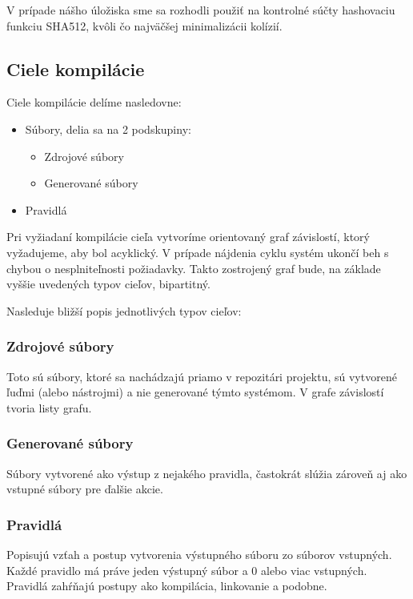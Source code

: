 V prípade nášho úložiska sme sa rozhodli použiť na kontrolné súčty hashovaciu funkciu
SHA512, kvôli čo najväčšej minimalizácii kolízií.

\subsection{Ciele kompil\'{a}cie}
\label{sub:solution:targets}
Ciele kompilácie delíme nasledovne:

\begin{itemize}
  \item Súbory, delia sa na 2 podskupiny:
    \begin{itemize}
      \item Zdrojové súbory
      \item Generované súbory
    \end{itemize}
  \item Pravidlá
\end{itemize}

Pri vyžiadaní kompilácie cieľa vytvoríme orientovaný graf závislostí, ktorý vyžadujeme,
aby bol acyklický. V prípade nájdenia cyklu systém ukončí beh s chybou o nesplniteľnosti
požiadavky. Takto zostrojený graf bude, na základe vyššie uvedených typov cieľov,
bipartitný.

Nasleduje bližší popis jednotlivých typov cieľov:

\subsubsection{Zdrojové súbory}
Toto sú súbory, ktoré sa nachádzajú priamo v repozitári projektu, sú vytvorené
ľuďmi (alebo nástrojmi) a nie generované týmto systémom. V grafe závislostí
tvoria listy grafu.

\subsubsection{Generované súbory}
Súbory vytvorené ako výstup z nejakého pravidla, častokrát slúžia zároveň aj ako
vstupné súbory pre ďalšie akcie.

\subsubsection{Pravidlá}
Popisujú vzťah a postup vytvorenia výstupného súboru zo súborov vstupných.
Každé pravidlo má práve jeden výstupný súbor a 0 alebo viac vstupných. Pravidlá
zahŕňajú postupy ako kompilácia, linkovanie a podobne.

